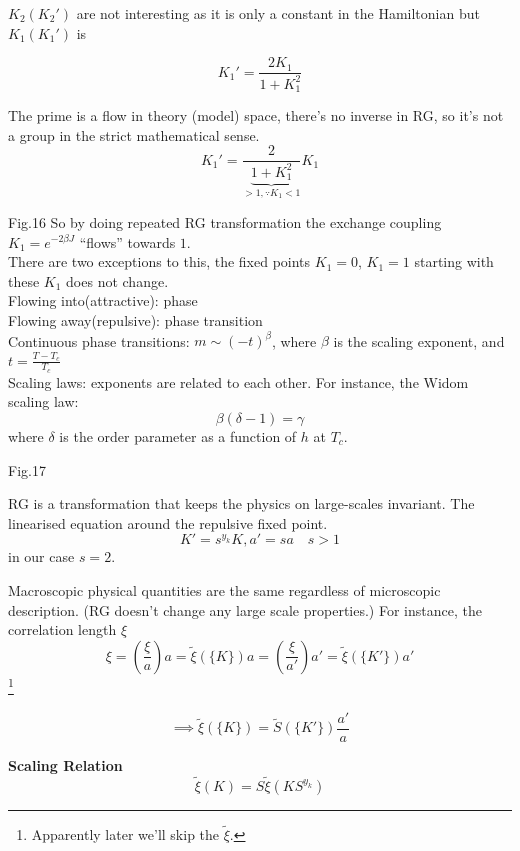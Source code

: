 \documentclass[11pt]{book}
\theoremstyle{definition}
\begin{document}
$ K_2(K_2') $ are not interesting as it is only a constant in the Hamiltonian but $ K_1(K_1') $ is
\begin{shaded*}
	\[ K_1' = \frac{2K_1}{1+K_1^2} \] 
\end{shaded*}
The prime is a flow in theory (model) space, there's no inverse in RG, so it's not a group in the strict mathematical sense. \\

\[ K_1' = \frac{2}{\underbrace{1+K_1^2}_{>1, \because K_1<1}}K_1 \] 

{\color{red} Fig.16 } 
So by doing repeated RG transformation the exchange coupling $ K_1 = e^{-2\beta J}$ ``flows'' towards $1$.  \\
There are two exceptions to this, the fixed points $ K_1=0 $, $ K_1=1 $ starting with these $ K_1 $ does not change. \\
Flowing into(attractive): phase \\
Flowing away(repulsive): phase transition \\


Continuous phase transitions: $ m \sim (-t)^{\beta} $, where $\beta $ is the scaling exponent, and $t =  \frac{T-T_c}{T_c} $ \\
Scaling laws: exponents are related to each other. For instance, the Widom scaling law: \[ \beta(\delta -1) = \gamma \] 
where $ \delta $ is the order parameter as a function of $ h $ at $ T_c $.

{\color{red} Fig.17 } 

RG is a transformation that keeps the physics on large-scales invariant.
The linearised equation around the repulsive fixed point.
\[ K' = s^{y_k}K, a' = sa  \quad s>1\] 
in our case $ s=2 $.

Macroscopic physical quantities are the same regardless of microscopic description. (RG doesn't change any large scale properties.) For instance, the correlation length $ \xi $  \\
\[ \xi = \left( \frac{\xi}{a} \right) a = \tilde \xi \left( \{K\} \right)  a = \left( \frac{\xi}{a'} \right) a' = \tilde \xi \left( \{ K' \}  \right) a' \]\footnote{Apparently later we'll skip the $\tilde \xi$.}

\[ \implies \tilde \xi \left( \{ K \}  \right) = \tilde S
\left( \{ K' \}  \right) \frac{a'}{a} \] 

\begin{shaded*}
	\textbf{Scaling Relation}
	\[\tilde \xi \left( K \right) = S \tilde \xi \left( KS^{y_k} \right) \]
\end{shaded*}
\end{document}
